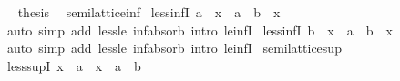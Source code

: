 \begin{isabellebody}
\ \isamarkupfalse%
\ {\isacharquery}{\kern0pt}thesis\ \isacommand{{\isachardot}{\kern0pt}}\isamarkupfalse%
\isanewline
{}\isamarkupfalse%
%
\endisatagproof
{\isafoldproof}%
%
\isadelimproof
\isanewline
%
\endisadelimproof
\isanewline
{}\isamarkupfalse%
%
\isadelimdocument
%
\endisadelimdocument
%
\isatagdocument
%
\isamarkuptrue%
%
\endisatagdocument
{\isafolddocument}%
%
\isadelimdocument
%
\endisadelimdocument
{}\isamarkupfalse%
\ semilattice{\isacharunderscore}{\kern0pt}inf\isanewline
{}\isanewline
\isanewline
{}\isamarkupfalse%
\ less{\isacharunderscore}{\kern0pt}infI{}{\isacharcolon}{\kern0pt}\ {\isachardoublequoteopen}a\ {\isacharless}{\kern0pt}\ x\ {\isasymLongrightarrow}\ a\ {\isasymsqinter}\ b\ {\isacharless}{\kern0pt}\ x{\isachardoublequoteclose}\isanewline
%
\isadelimproof
\ \ %
\endisadelimproof
%
\isatagproof
{}\isamarkupfalse%
\ {\isacharparenleft}{\kern0pt}auto\ simp\ add{\isacharcolon}{\kern0pt}\ less{\isacharunderscore}{\kern0pt}le\ inf{\isacharunderscore}{\kern0pt}absorb{}\ intro{\isacharcolon}{\kern0pt}\ le{\isacharunderscore}{\kern0pt}infI{}{\isacharparenright}{\kern0pt}%
\endisatagproof
{\isafoldproof}%
%
\isadelimproof
\isanewline
%
\endisadelimproof
\isanewline
{}\isamarkupfalse%
\ less{\isacharunderscore}{\kern0pt}infI{}{\isacharcolon}{\kern0pt}\ {\isachardoublequoteopen}b\ {\isacharless}{\kern0pt}\ x\ {\isasymLongrightarrow}\ a\ {\isasymsqinter}\ b\ {\isacharless}{\kern0pt}\ x{\isachardoublequoteclose}\isanewline
%
\isadelimproof
\ \ %
\endisadelimproof
%
\isatagproof
{}\isamarkupfalse%
\ {\isacharparenleft}{\kern0pt}auto\ simp\ add{\isacharcolon}{\kern0pt}\ less{\isacharunderscore}{\kern0pt}le\ inf{\isacharunderscore}{\kern0pt}absorb{}\ intro{\isacharcolon}{\kern0pt}\ le{\isacharunderscore}{\kern0pt}infI{}{\isacharparenright}{\kern0pt}%
\endisatagproof
{\isafoldproof}%
%
\isadelimproof
\isanewline
%
\endisadelimproof
\isanewline
{}\isamarkupfalse%
\isanewline
\isanewline
{}\isamarkupfalse%
\ semilattice{\isacharunderscore}{\kern0pt}sup\isanewline
{}\isanewline
\isanewline
{}\isamarkupfalse%
\ less{\isacharunderscore}{\kern0pt}supI{}{\isacharcolon}{\kern0pt}\ {\isachardoublequoteopen}x\ {\isacharless}{\kern0pt}\ a\ {\isasymLongrightarrow}\ x\ {\isacharless}{\kern0pt}\ a\ {\isasymsqunion}\ b{\isachardoublequoteclose}\isanewline

\end{isabellebody}
